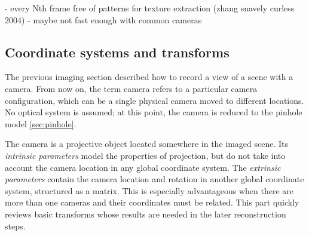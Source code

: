 - every Nth frame free of patterns for texture extraction (zhang snavely curless 2004)
- maybe not fast enough with common cameras


\subsection{Coordinate systems and transforms} %




The previous imaging section described how to record a view of a scene with a camera. From now on, the term camera refers to a particular camera configuration, which can be a single physical camera moved to different locations.
No optical system is assumed; at this point, the camera is reduced to the pinhole model \ref{sec:pinhole}.


The camera is a projective object located somewhere in the imaged scene.
Its \textit{intrinsic parameters} model the properties of projection, but do not take into account the camera location in any global coordinate system.
The \textit{extrinsic parameters} contain the camera location and rotation in another global coordinate system, structured as a matrix.
This is especially advantageous when there are more than one cameras and their coordinates must be related.
\cite{hartley03multiview,heyden2005multiple}
This part quickly reviews basic transforms whose results are needed in the later reconstruction steps.



